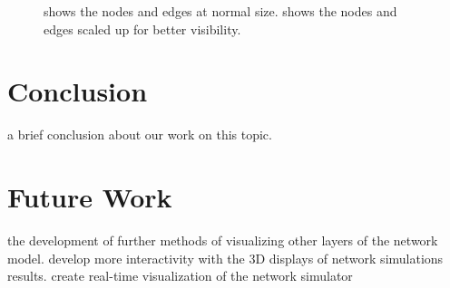 \begin{figure}[ht]
\centering
{}
  \caption{ shows the nodes and edges at normal size.   shows the nodes and edges scaled up for better visibility.}
\label{fig:3d_terrain_node_scale}
\end{figure}

\section{Conclusion}
a brief conclusion about our work on this topic.

\section{Future Work}
the development of further methods of visualizing other layers of the network model.
develop more interactivity with the 3D displays of network simulations results.
create real-time visualization of the network simulator
